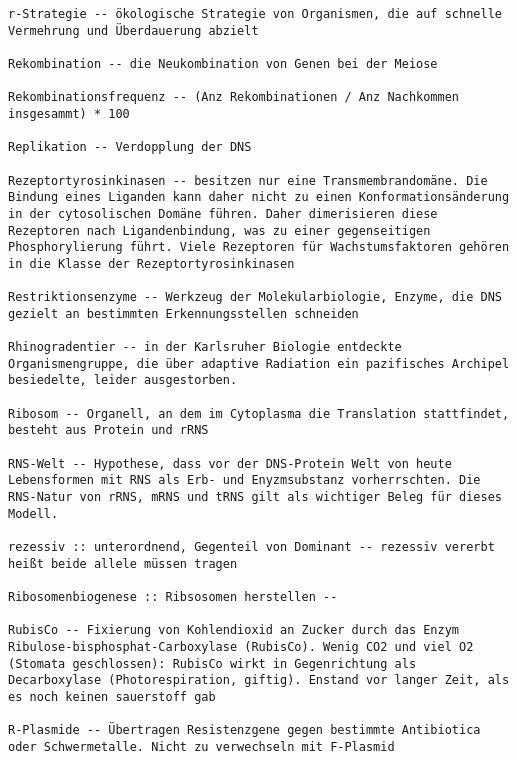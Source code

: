 \documentclass{article}
\begin{document}
\begin{verbatim}
r-Strategie -- ökologische Strategie von Organismen, die auf schnelle Vermehrung und Überdauerung abzielt

Rekombination -- die Neukombination von Genen bei der Meiose

Rekombinationsfrequenz -- (Anz Rekombinationen / Anz Nachkommen insgesammt) * 100 

Replikation -- Verdopplung der DNS

Rezeptortyrosinkinasen -- besitzen nur eine Transmembrandomäne. Die Bindung eines Liganden kann daher nicht zu einen Konformationsänderung in der cytosolischen Domäne führen. Daher dimerisieren diese Rezeptoren nach Ligandenbindung, was zu einer gegenseitigen Phosphorylierung führt. Viele Rezeptoren für Wachstumsfaktoren gehören in die Klasse der Rezeptortyrosinkinasen

Restriktionsenzyme -- Werkzeug der Molekularbiologie, Enzyme, die DNS gezielt an bestimmten Erkennungsstellen schneiden

Rhinogradentier -- in der Karlsruher Biologie entdeckte Organismengruppe, die über adaptive Radiation ein pazifisches Archipel besiedelte, leider ausgestorben.

Ribosom -- Organell, an dem im Cytoplasma die Translation stattfindet, besteht aus Protein und rRNS

RNS-Welt -- Hypothese, dass vor der DNS-Protein Welt von heute Lebensformen mit RNS als Erb- und Enyzmsubstanz vorherrschten. Die RNS-Natur von rRNS, mRNS und tRNS gilt als wichtiger Beleg für dieses Modell.

rezessiv :: unterordnend, Gegenteil von Dominant -- rezessiv vererbt heißt beide allele müssen tragen

Ribosomenbiogenese :: Ribsosomen herstellen -- 

RubisCo -- Fixierung von Kohlendioxid an Zucker durch das Enzym Ribulose-bisphosphat-Carboxylase (RubisCo). Wenig CO2 und viel O2 (Stomata geschlossen): RubisCo wirkt in Gegenrichtung als Decarboxylase (Photorespiration, giftig). Enstand vor langer Zeit, als es noch keinen sauerstoff gab

R-Plasmide -- Übertragen Resistenzgene gegen bestimmte Antibiotica oder Schwermetalle. Nicht zu verwechseln mit F-Plasmid

\end{verbatim}
\newpage
\end{document}
